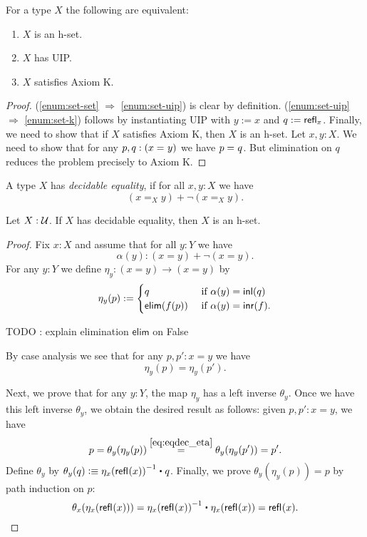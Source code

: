 \begin{thm}\label{thm:h-set-uip-K}
 For a type $X$ the following are equivalent:
 \begin{enumerate}
  \item\label{enum:set-set} $X$ is an h-set.
  \item\label{enum:set-uip} $X$ has UIP.
  \item\label{enum:set-k} $X$ satisfies Axiom K.
 \end{enumerate}
\end{thm}

\begin{proof} (\ref{enum:set-set} $\Rightarrow$ \ref{enum:set-uip}) is clear by definition. (\ref{enum:set-uip} $\Rightarrow$ \ref{enum:set-k}) follows by instantiating UIP with $y := x$ and $q := \mathsf{refl}_{x}$.
Finally, we need to show that if $X$ satisfies Axiom K, then $X$ is an h-set. Let $x, y : X$. We need to show that for any $p, q : (x =_{} y)$ we have $p =_{} q$. But elimination on $q$ reduces the problem precisely to Axiom K.
\end{proof}

\begin{defn}
 A type $X$ has {\em decidable equality}, if for all $x, y : X$ we have
 \[(x =_X y) + \neg (x =_X y).\]
\end{defn}

\begin{thm}
 Let $X : \mathcal{U}$. If $X$ has decidable equality, then $X$ is an h-set.
\end{thm}

\begin{proof}
Fix $x : X$ and assume that for all $y : Y$ we have
  \[\alpha(y) : (x = y) + \neg (x = y). \]
  For any $y : Y$ we define
      $  \eta_y : (x = y) \to (x = y) $
    by
    \[ \eta_y(p) := \begin{cases}
                     q & \text{ if } \alpha(y) = \mathsf{inl}(q) \\
                     \mathsf{elim}(f(p)) & \text{ if } \alpha(y) = \mathsf{inr}(f).
                    \end{cases}
\]

TODO : explain elimination $\mathsf{elim}$ on False

\noindent
 By case analysis we see that for any $p, p' : x = y$ we have
 \begin{equation}\eta_y(p) = \eta_y(p') . \label{eq:eqdec_eta}\end{equation}

 \noindent
 Next, we prove that for any $y : Y$, the map $\eta_y$ has a left inverse $\theta_y$.
   Once we have this left inverse $\theta_y$, we obtain the desired result as follows: given
     $p, p' : x = y$, we have
   \[ p = \theta_y (\eta_y(p)) \stackrel{\ref{eq:eqdec_eta}}{=} \theta_y (\eta_y(p')) = p' . \]
 Define $\theta_y$ by
     $\theta_y(q) \defeq \opp{\eta_x(\refl{}(x))} \ct q$.
  Finally, we prove $\theta_y(\eta_y(p)) = p$ by path induction on $p$:
   \[\theta_x(\eta_x(\refl{}(x))) = \opp{\eta_x(\refl{}(x))} \ct \eta_x(\refl{}(x)) = \refl{}(x). \]

\end{proof}

